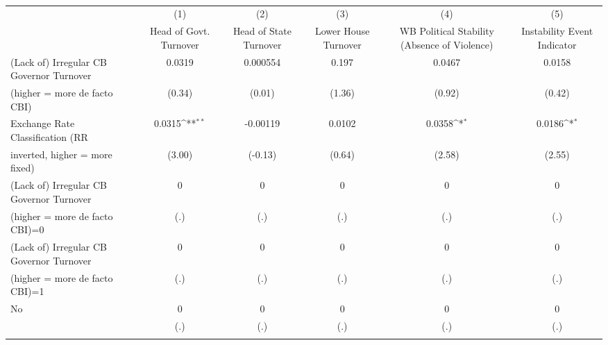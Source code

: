 \begin{table}[htbp]\centering
\def\sym#1{\ifmmode^{#1}\else\(^{#1}\)\fi}
\caption{\label{ifullicmultIndFEDF}}
\begin{tabular}{l*{5}{c}}
\toprule
                                        &\multicolumn{1}{c}{(1)}&\multicolumn{1}{c}{(2)}&\multicolumn{1}{c}{(3)}&\multicolumn{1}{c}{(4)}&\multicolumn{1}{c}{(5)}\\
                                        &\multicolumn{1}{c}{Head of Govt. Turnover}&\multicolumn{1}{c}{Head of State Turnover}&\multicolumn{1}{c}{Lower House Turnover}&\multicolumn{1}{c}{WB Political Stability (Absence of Violence)}&\multicolumn{1}{c}{Instability Event Indicator}\\
\midrule
(Lack of) Irregular CB Governor Turnover&   0.0319         & 0.000554         &    0.197         &   0.0467         &   0.0158         \\
(higher = more de facto CBI)            &   (0.34)         &   (0.01)         &   (1.36)         &   (0.92)         &   (0.42)         \\
\addlinespace
Exchange Rate Classification (RR        &   0.0315\sym{**} & -0.00119         &   0.0102         &   0.0358\sym{*}  &   0.0186\sym{*}  \\
inverted, higher = more fixed)          &   (3.00)         &  (-0.13)         &   (0.64)         &   (2.58)         &   (2.55)         \\
\addlinespace
(Lack of) Irregular CB Governor Turnover&        0         &        0         &        0         &        0         &        0         \\
(higher = more de facto CBI)=0          &      (.)         &      (.)         &      (.)         &      (.)         &      (.)         \\
\addlinespace
(Lack of) Irregular CB Governor Turnover&        0         &        0         &        0         &        0         &        0         \\
(higher = more de facto CBI)=1          &      (.)         &      (.)         &      (.)         &      (.)         &      (.)         \\
\addlinespace
No                                      &        0         &        0         &        0         &        0         &        0         \\
                                        &      (.)         &      (.)         &      (.)         &      (.)         &      (.)         \\
\addlinespace

\end{tabular}
\end{table}
